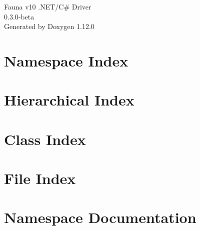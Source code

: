 \documentclass[twoside]{book}
\newcommand{\+}{\discretionary{\mbox{\scriptsize$\hookleftarrow$}}{}{}}
\newcommand{\clearemptydoublepage}{%
    \newpage{\pagestyle{empty}\cleardoublepage}%
  }
\begin{document}
  \raggedbottom
    \hypersetup{pageanchor=false,
                bookmarksnumbered=true,
                pdfencoding=unicode
               }
  \begin{titlepage}
  \vspace*{7cm}
  \begin{center}%
  {\Large Fauna v10 .\+NET/\+C\# Driver}\\
  [1ex]\large 0.\+3.\+0-\/beta \\
  \vspace*{1cm}
  {\large Generated by Doxygen 1.12.0}\\
  \end{center}
  \end{titlepage}
  \clearemptydoublepage
  \tableofcontents
  \clearemptydoublepage
  \hypersetup{pageanchor=true}
\chapter{Namespace Index}

\chapter{Hierarchical Index}

\chapter{Class Index}

\chapter{File Index}

\chapter{Namespace Documentation}









\end{document}
